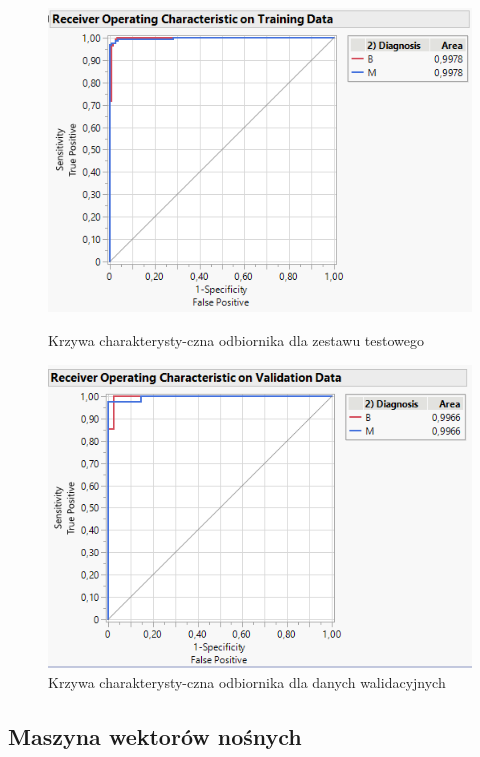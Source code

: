 \begin{figure}[!ht]
	\begin{minipage}{0.48\textwidth}
			\centering
			\includegraphics[width=0.95\linewidth]{Rozdzial3/roc_test}
			\caption{Krzywa charakterysty-czna odbiornika dla zestawu testowego}
			\label{fig:roctest}
	\end{minipage}%
	\hspace{8pt}
	\begin{minipage}{0.48\textwidth}
			\centering
			\includegraphics[width=0.95\linewidth]{Rozdzial3/roc_valid}
			\caption{Krzywa charakterysty-czna odbiornika dla danych walidacyjnych}
			\label{fig:rocvalid}
	\end{minipage}
\end{figure}







\subsection{Maszyna wektorów nośnych}